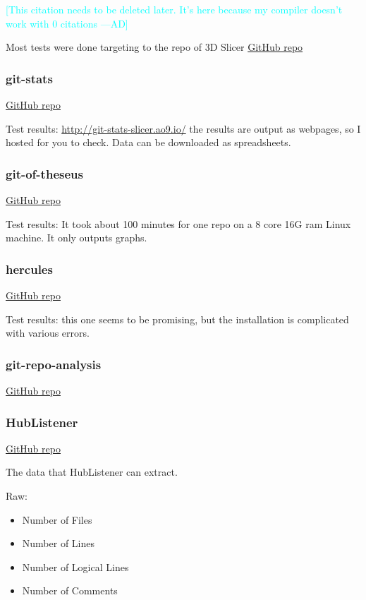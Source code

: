 \documentclass[letterpaper,cleveref]{lipics-v2019}
\newcommand{\authornote}[3]{\textcolor{#1}{[#3 ---#2]}}
\newcommand{\authornote}[3]{}
\newcommand{\ad}[1]{\authornote{cyan}{AD}{#1}} %
\theoremstyle{definition}
\begin{document}
\ad{This citation needs to be deleted later. It's here because my compiler
doesn't work with 0 citations}
\cite{Emms2019}

Most tests were done targeting to the repo of 3D Slicer
\href{https://github.com/tomgi/git_stats}{GitHub repo}

\subsubsection{git-stats}
\href{https://github.com/tomgi/git_stats}{GitHub repo}

Test results:
\href{http://git-stats-slicer.ao9.io/}{http://git-stats-slicer.ao9.io/} the
results are output as webpages, so I hosted for you to check. Data can be
downloaded as spreadsheets.

\subsubsection{git-of-theseus}
\href{https://github.com/erikbern/git-of-theseus}{GitHub repo}

Test results: It took about 100 minutes for one repo on a 8 core 16G ram Linux
machine. It only outputs graphs.

\subsubsection{hercules}
\href{https://github.com/src-d/hercules}{GitHub repo}

Test results: this one seems to be promising, but the installation is
complicated with various errors.

\subsubsection{git-repo-analysis}
\href{https://github.com/larsxschneider/git-repo-analysis}{GitHub repo}

\subsubsection{HubListener}
\href{https://github.com/pjmc-oliveira/HubListener}{GitHub repo}

The data that HubListener can extract.

Raw:
\begin{itemize}
\item Number of Files
\item Number of Lines
\item Number of Logical Lines
\item Number of Comments
\end{itemize}
\end{document}
